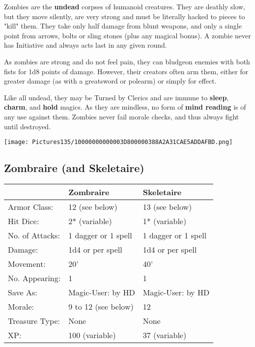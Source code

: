 \documentclass[a4paper,twoside,openany,10pt]{book}
\begin{document}
\begin{multicols}{2}
Zombies are the \textbf{undead} corpses of humanoid creatures. They are deathly slow, but they move silently, are very strong and must be literally hacked to pieces to "kill" them. They take only half damage from blunt weapons, and only a single point from arrows, bolts or sling stones (plus any magical bonus). A zombie never has Initiative and always acts last in any given round.

As zombies are strong and do not feel pain, they can bludgeon enemies with both fists for 1d8 points of damage. However, their creators often arm them, either for greater damage (as with a greatsword or polearm) or simply for effect.

Like all undead, they may be Turned by Clerics and are immune to \textbf{sleep}, \textbf{charm},\textbf{ }and \textbf{hold} magics. As they are mindless, no form of \textbf{mind reading} is of any use against them. Zombies never fail morale checks, and thus always fight until destroyed.

\begin{center} \texttt{[image: Pictures135/10000000000003D800000388A2A31CAE5ADDAFBD.png]} \end{center}

\subsection*{Zombraire (and Skeletaire)}\label{zombraire-and-skeletaire}

\begin{tabularx}{0.50\textwidth}{@{}lXX@{}}
& Zombraire & Skeletaire \\\hline
Armor Class: & 12 (see below) & 13 (see below) \\\hline
Hit Dice: & 2* (variable) & 1* (variable) \\\hline
No. of Attacks: & 1 dagger or 1 spell & 1 dagger or 1 spell \\\hline
Damage: & 1d4 or per spell & 1d4 or per spell \\\hline
Movement: & 20' & 40' \\\hline
No. Appearing: & 1 & 1 \\\hline
Save As: & Magic-User: by HD & Magic-User: by HD \\\hline
Morale: & 9 to 12 (see below) & 12 \\\hline
Treasure Type: & None & None \\\hline
XP: & 100 (variable) & 37 (variable) \\\hline
\end{tabularx}\medskip


\end{multicols}
\end{document}
